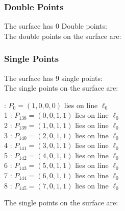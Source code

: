 \documentclass{article}
\begin{document}
{\subsubsection*{Double Points}
The surface has 0 Double points:\\
The double points on the surface are:\\
\begin{multicols}{2}
\noindent
\end{multicols}
\subsubsection*{Single Points}
The surface has 9 single points:\\
The single points on the surface are:\\
\begin{multicols}{2}
 : $P_{0}=( 1, 0, 0, 0 )$ lies on line $\ell_{0}$\\
1 : $P_{138}=( 0, 0, 1, 1 )$ lies on line $\ell_{0}$\\
2 : $P_{139}=( 1, 0, 1, 1 )$ lies on line $\ell_{0}$\\
3 : $P_{140}=( 2, 0, 1, 1 )$ lies on line $\ell_{0}$\\
4 : $P_{141}=( 3, 0, 1, 1 )$ lies on line $\ell_{0}$\\
5 : $P_{142}=( 4, 0, 1, 1 )$ lies on line $\ell_{0}$\\
6 : $P_{143}=( 5, 0, 1, 1 )$ lies on line $\ell_{0}$\\
7 : $P_{144}=( 6, 0, 1, 1 )$ lies on line $\ell_{0}$\\
8 : $P_{145}=( 7, 0, 1, 1 )$ lies on line $\ell_{0}$\\
\end{multicols}
The single points on the surface are:\\
}
\end{document}
